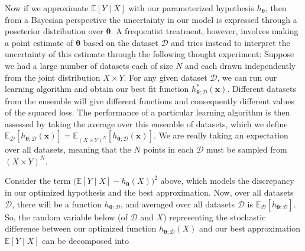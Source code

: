 \documentclass{article}
\begin{document}
    Now if we approximate $\mathbb{E}[Y \mid X]$ with our parameterized hypothesis $h_{\boldsymbol{\theta}}$, then from a Bayesian perspective the uncertainty in our model is expressed through a poseterior distribution over ${\boldsymbol{\theta}}$. A frequentist treatment, however, involves making a point estimate of ${\boldsymbol{\theta}}$ based on the dataset $\mathcal{D}$ and tries instead to interpret the uncertainty of this estimate through the following thought experiment: Suppose we had a large number of datasets each of size $N$ and each drawn independently from the joint distribution $X \times Y$. For any given dataset $\mathcal{D}$, we can run our learning algorithm and obtain our best fit function $h_{{\boldsymbol{\theta}}; \mathcal{D}}^\ast (\mathbf{x})$. Different datasets from the ensemble will give different functions and consequently different values of the squared loss. The performance of a particular learning algorithm is then assessed by taking the average over this ensemble of datasets, which we define $\mathbb{E}_\mathcal{D} [h_{{\boldsymbol{\theta}}; \mathcal{D}} (\mathbf{x})] = \mathbb{E}_{(X \times Y)^N} [h_{{\boldsymbol{\theta}}; \mathcal{D}} (\mathbf{x})]$. We are really taking an expectation over all datasets, meaning that the $N$ points in each $\mathcal{D}$ must be sampled from $(X \times Y)^N$. 

    Consider the term $\big(\mathbb{E}[Y \mid X] - h_{\boldsymbol{\theta}}(X) \big)^2$ above, which models the discrepancy in our optimized hypothesis and the best approximation. Now, over all datasets $\mathcal{D}$, there will be a function $h_{{\boldsymbol{\theta}}; \mathcal{D}}$, and averaged over all datasets $\mathcal{D}$ is $\mathbb{E}_\mathcal{D} [ h_{{\boldsymbol{\theta}}; \mathcal{D}}]$. So, the random variable below (of $\mathcal{D}$ and $X$) representing the stochastic difference between our optimized function $h_{{\boldsymbol{\theta}}; \mathcal{D}} (X)$ and our best approximation $\mathbb{E}[Y\mid X]$ can be decomposed into 
\end{document}
